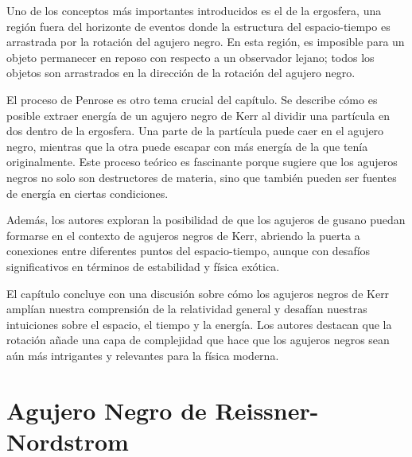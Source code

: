 \documentclass{article}
\begin{document}
Uno de los conceptos más importantes introducidos es el de la ergosfera, una región fuera del horizonte de eventos donde la estructura del espacio-tiempo es arrastrada por la rotación del agujero negro. En esta región, es imposible para un objeto permanecer en reposo con respecto a un observador lejano; todos los objetos son arrastrados en la dirección de la rotación del agujero negro.

El proceso de Penrose es otro tema crucial del capítulo. Se describe cómo es posible extraer energía de un agujero negro de Kerr al dividir una partícula en dos dentro de la ergosfera. Una parte de la partícula puede caer en el agujero negro, mientras que la otra puede escapar con más energía de la que tenía originalmente. Este proceso teórico es fascinante porque sugiere que los agujeros negros no solo son destructores de materia, sino que también pueden ser fuentes de energía en ciertas condiciones.

Además, los autores exploran la posibilidad de que los agujeros de gusano puedan formarse en el contexto de agujeros negros de Kerr, abriendo la puerta a conexiones entre diferentes puntos del espacio-tiempo, aunque con desafíos significativos en términos de estabilidad y física exótica.

El capítulo concluye con una discusión sobre cómo los agujeros negros de Kerr amplían nuestra comprensión de la relatividad general y desafían nuestras intuiciones sobre el espacio, el tiempo y la energía. Los autores destacan que la rotación añade una capa de complejidad que hace que los agujeros negros sean aún más intrigantes y relevantes para la física moderna.


\section{Agujero Negro de Reissner-Nordstrom}

\hfill
\end{document}
